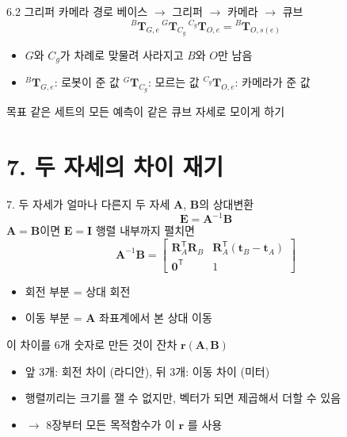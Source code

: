 \documentclass[aspectratio=169,11pt]{beamer}
\newcommand{\T}[3][]{{}^{#2}\mathbf{T}^{#1}_{#3}}   %
\begin{document}
\begin{frame}{6.2 그리퍼 카메라 경로}
  베이스 $\rightarrow$ 그리퍼 $\rightarrow$ 카메라 $\rightarrow$ 큐브
  \[
    \T{B}{G,e}\,
    \T{G}{C_g}\,
    \T{C_g}{O,e}
    =
    \T{B}{O,s(e)}
  \]
  \begin{itemize}
    \item $G$와 $C_g$가 차례로 맞물려 사라지고 $B$와 $O$만 남음
    \item $\T{B}{G,e}$: 로봇이 준 값 \quad
          $\T{G}{C_g}$: 모르는 값 \quad
          $\T{C_g}{O,e}$: 카메라가 준 값
  \end{itemize}
  \vfill
  \begin{alertblock}{목표}
    같은 세트의 모든 예측이 같은 큐브 자세로 모이게 하기
  \end{alertblock}
\end{frame}

\section{7. 두 자세의 차이 재기}

\begin{frame}{7. 두 자세가 얼마나 다른지}
  두 자세 $\mathbf{A}$, $\mathbf{B}$의 상대변환
  \[
    \mathbf{E} = \mathbf{A}^{-1}\mathbf{B}
  \]
  $\mathbf{A}=\mathbf{B}$이면 $\mathbf{E}=\mathbf{I}$
  \vfill
  행렬 내부까지 펼치면
  \[
    \mathbf{A}^{-1}\mathbf{B}
    =
    \begin{bmatrix}
      \mathbf{R}_A^{\mathsf T}\mathbf{R}_B
      & \mathbf{R}_A^{\mathsf T}(\mathbf{t}_B-\mathbf{t}_A) \\
      \mathbf{0}^{\mathsf T} & 1
    \end{bmatrix}
  \]
  \begin{itemize}
    \item 회전 부분 = 상대 회전
    \item 이동 부분 = $\mathbf{A}$ 좌표계에서 본 상대 이동
  \end{itemize}
  \vfill
  \begin{block}{이 차이를 $6$개 숫자로 만든 것이 잔차 $\mathbf{r}(\mathbf{A},\mathbf{B})$}
    \begin{itemize}
      \item 앞 $3$개: 회전 차이 (라디안), 뒤 $3$개: 이동 차이 (미터)
      \item 행렬끼리는 크기를 잴 수 없지만, 벡터가 되면 제곱해서 더할 수 있음
      \item $\rightarrow$ 8장부터 모든 목적함수가 이 $\mathbf{r}$ 를 사용
    \end{itemize}
  \end{block}
\end{frame}
\end{document}
